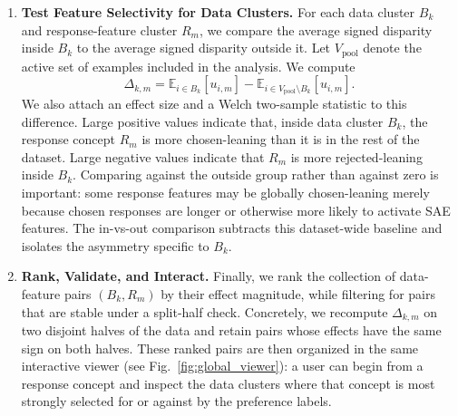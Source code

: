 \documentclass{article} %
\begin{document}
\begin{enumerate}[leftmargin=*]
\item \textbf{Test Feature Selectivity for Data Clusters.} For each data cluster $B_k$ and response-feature cluster $R_m$, we compare the average signed disparity inside $B_k$ to the average signed disparity outside it. Let $V_{\text{pool}}$ denote the active set of examples included in the analysis. We compute
\begin{equation}
\Delta_{k,m} = \mathbb{E}_{i \in B_k}[u_{i,m}] - \mathbb{E}_{i \in V_{\text{pool}}\setminus B_k}[u_{i,m}].
\end{equation}
We also attach an effect size and a Welch two-sample statistic to this difference. Large positive values indicate that, inside data cluster $B_k$, the response concept $R_m$ is more chosen-leaning than it is in the rest of the dataset. Large negative values indicate that $R_m$ is more rejected-leaning inside $B_k$. Comparing against the outside group rather than against zero is important: some response features may be globally chosen-leaning merely because chosen responses are longer or otherwise more likely to activate SAE features. The in-vs-out comparison subtracts this dataset-wide baseline and isolates the asymmetry specific to $B_k$.

\item \textbf{Rank, Validate, and Interact.} Finally, we rank the collection of data-feature pairs $(B_k,R_m)$ by their effect magnitude, while filtering for pairs that are stable under a split-half check. Concretely, we recompute $\Delta_{k,m}$ on two disjoint halves of the data and retain pairs whose effects have the same sign on both halves. These ranked pairs are then organized in the same interactive viewer (see Fig.~\ref{fig:global_viewer}): a user can begin from a response concept and inspect the data clusters where that concept is most strongly selected for or against by the preference labels.
\end{enumerate}
\end{document}
